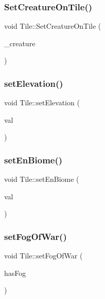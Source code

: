\subsubsection{\texorpdfstring{Set\+Creature\+On\+Tile()}{SetCreatureOnTile()}}
{\footnotesize\ttfamily void Tile\+::\+Set\+Creature\+On\+Tile (\begin{DoxyParamCaption}\item[{\mbox{\hyperlink{class_base_creature}{Base\+Creature}} $\ast$}]{\+\_\+creature }\end{DoxyParamCaption})}

\mbox{\label{class_tile_a4037e18197615a94312b6a0bc73fe2ec}} 
\subsubsection{\texorpdfstring{set\+Elevation()}{setElevation()}}
{\footnotesize\ttfamily void Tile\+::set\+Elevation (\begin{DoxyParamCaption}\item[{double}]{val }\end{DoxyParamCaption})}

\mbox{\label{class_tile_ae03b5d774807e88f80d11ad3853f2c4f}} 
\subsubsection{\texorpdfstring{set\+En\+Biome()}{setEnBiome()}}
{\footnotesize\ttfamily void Tile\+::set\+En\+Biome (\begin{DoxyParamCaption}\item[{\mbox{\hyperlink{_enum_types_8hpp_a5c2255009cd01c90cf68245e6f453d1c}{en\+Biomes}}}]{val }\end{DoxyParamCaption})}

\mbox{\label{class_tile_a3ff149871212dea894dd8e4f6cfe26af}} 
\subsubsection{\texorpdfstring{set\+Fog\+Of\+War()}{setFogOfWar()}}
{\footnotesize\ttfamily void Tile\+::set\+Fog\+Of\+War (\begin{DoxyParamCaption}\item[{bool}]{has\+Fog }\end{DoxyParamCaption})}

